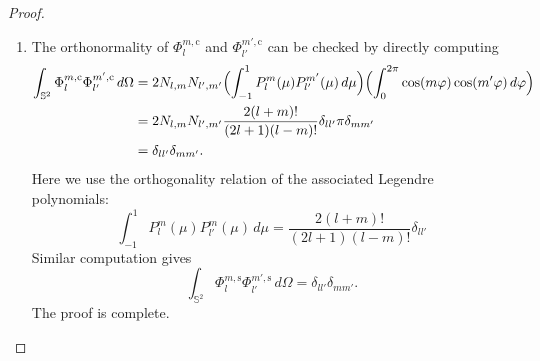 \documentclass[11pt]{article}
\numberwithin{equation}{section}
\begin{document}
\begin{proof}
\begin{enumerate}
    \item 
    The orthonormality of \(\Phi_l^{m,\mathrm c}\) and \(\Phi_{l'}^{m',\mathrm c}\) can be checked by directly computing
    \begin{equation}
    \begin{aligned}
        \int_{\mathbb S^2}\Phi_l^{m,\mathrm c}\Phi_{l'}^{m',\mathrm c}\,d\Omega ={}&
        2N_{l,m}N_{l',m'}\Bigl(\int_{-1}^1 P_l^m(\mu)P_{l'}^{m'}(\mu)\,d\mu\Bigr)\Bigl(\int_0^{2\pi}\cos(m\varphi)\cos(m'\varphi)\,d\varphi\Bigr) \\
        ={}& 2N_{l,m}N_{l',m'} \frac{2(l+m)!}{(2l+1)(l-m)!}\delta_{ll'} \pi \delta_{mm'} \\
        ={}& \delta_{ll'}\delta_{mm'}.
    \end{aligned}
    \end{equation}
    Here we use the orthogonality relation of the associated Legendre polynomials:
    \begin{equation}
        \int_{-1}^1 P_l^m(\mu)P_{l'}^m(\mu)\,d\mu = \frac{2(l+m)!}{(2l+1)(l-m)!}\delta_{ll'}
    \end{equation}
    Similar computation gives
    \begin{equation}
    \int_{\mathbb S^2}\Phi_l^{m,\mathrm s}\Phi_{l'}^{m',\mathrm s}\,d\Omega = \delta_{ll'}\delta_{mm'}.
    \end{equation}
    The proof is complete.
\end{enumerate}
\end{proof}
\end{document}
